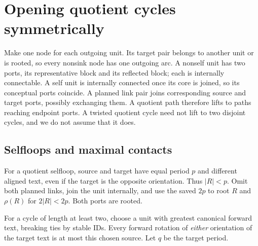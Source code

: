 \section{Opening quotient cycles symmetrically}\label{sec:cycles}
Make one node for each outgoing unit. Its target pair belongs to another
unit or is rooted, so every nonsink node has one outgoing arc.
A nonself unit has two ports, its representative block and its reflected
block; each is internally connectable. A self unit is internally
connected once its core is joined, so its conceptual ports coincide.
A planned link pair joins corresponding source and target ports,
possibly exchanging them. A quotient path therefore lifts to paths
reaching endpoint ports. A twisted quotient cycle need not lift to two
disjoint cycles, and we do not assume that it does.

\subsection{Selfloops and maximal contacts}\label{sec:contacts}
For a quotient selfloop, source and target have equal period $p$ and
different aligned text, even if the target is the opposite orientation.
Thus $|R|<p$. Omit both planned links, join the unit internally, and
use the saved $2p$ to root $R$ and $\rho(R)$ for $2|R|<2p$.
Both ports are rooted.

For a cycle of length at least two, choose a unit with greatest canonical
forward text, breaking ties by stable IDs. Every forward rotation of
\emph{either} orientation of the target text is at most this chosen
source. Let $q$ be the target period.

